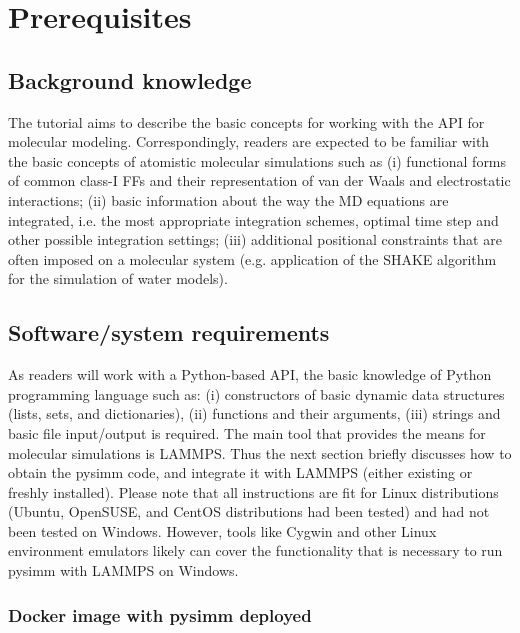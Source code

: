 \documentclass[9pt,tutorial]{livecoms}
\begin{document}
\section{Prerequisites}

\subsection{Background knowledge}

The tutorial aims to describe the basic concepts for working with the API for molecular modeling. Correspondingly, readers are expected to be familiar with the basic concepts of atomistic molecular simulations such as (i) functional forms of common class-I FFs and their representation of van der Waals and electrostatic interactions; (ii) basic information about the way the MD equations are integrated, i.e. the most appropriate integration schemes, optimal time step and other possible integration settings; (iii) additional positional constraints that are often imposed on a molecular system (e.g. application of the SHAKE algorithm for the simulation of water models).

\subsection{Software/system requirements}

As readers will work with a Python-based API, the basic knowledge of Python programming language such as: (i) constructors of basic dynamic data structures (lists, sets, and dictionaries), (ii) functions and their arguments, (iii) strings and basic file input/output is required. 
The main tool that provides the means for molecular simulations is LAMMPS. Thus the next section briefly discusses how to obtain the pysimm code, and integrate it with LAMMPS (either existing or freshly installed). Please note that all instructions are fit for Linux distributions (Ubuntu, OpenSUSE, and CentOS distributions had been tested) and had not been tested on Windows. However, tools like Cygwin and other Linux environment emulators likely can cover the functionality that is necessary to run pysimm with LAMMPS on Windows. 

\subsubsection{Docker image with pysimm deployed}
\end{document}
